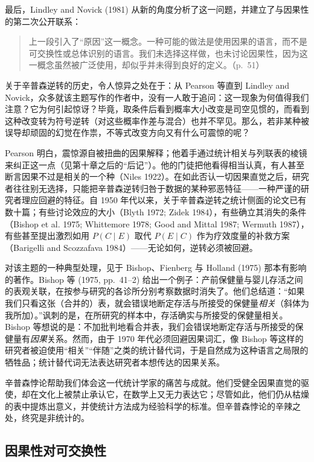 最后，Lindley and Novick (1981) 从新的角度分析了这一问题，并建立了与因果性的第二次公开联系：

\begin{quote}
\kaishu
上一段引入了“原因”这一概念。一种可能的做法是使用因果的语言，而不是可交换性或总体识别的语言。我们未选择这样做，也未讨论因果性，因为这一概念虽然被广泛使用，却似乎并未得到良好的定义。（p.~51）
\end{quote}

关于辛普森逆转的历史，令人惊异之处在于：从 Pearson 等直到 Lindley and Novick，众多就该主题写作的作者中，没有一人敢于追问：这一现象为何值得我们注意？它为何引起惊讶？毕竟，取条件后看到概率大小改变是司空见惯的，而看到这种改变转为符号逆转（对这些概率作差与混合）也并不罕见。那么，若非某种被误导却顽固的幻觉在作祟，不等式改变方向又有什么可震惊的呢？

Pearson 明白，震惊源自被扭曲的因果解释；他着手通过统计相关与列联表的棱镜来纠正这一点（见第十章之后的“后记”）。他的门徒把他看得相当认真，有人甚至断言因果不过是相关的一个种（Niles 1922）。在如此否认一切因果直觉之后，研究者往往别无选择，只能把辛普森逆转归咎于数据的某种邪恶特征——一种严谨的研究者理应回避的特征。自 1950 年代以来，关于辛普森逆转之统计侧面的论文已有数十篇；有些讨论效应的大小（Blyth 1972; Zidek 1984），有些确立其消失的条件（Bishop et al. 1975; Whittemore 1978; Good and Mittal 1987; Wermuth 1987），有些甚至提出激烈如用 $P(C\mid E)$ 取代 $P(E\mid C)$ 作为疗效度量的补救方案（Barigelli and Scozzafava 1984）——无论如何，逆转必须被回避。

对该主题的一种典型处理，见于 Bishop、Fienberg 与 Holland (1975) 那本有影响的著作。Bishop 等 (1975, pp.~41--2) 给出一个例子：产前保健量与婴儿存活之间的表观关联，在按参与研究的各诊所分别考察数据时消失了。他们总结道：“如果我们只看这张（合并的）表，就会错误地断定存活与所接受的保健量\emph{相关}（斜体为我所加）。”讽刺的是，在所研究的样本中，存活确实与所接受的保健量相关。Bishop 等想说的是：不加批判地看合并表，我们会错误地断定存活与所接受的保健量有\emph{因果}关系。然而，由于 1970 年代必须回避因果词汇，像 Bishop 等这样的研究者被迫使用“相关”“伴随”之类的统计替代词，于是自然成为这种语言之局限的牺牲品；统计替代词无法表达研究者本想传达的因果关系。

辛普森悖论帮助我们体会这一代统计学家的痛苦与成就。他们受健全因果直觉的驱使，却在文化上被禁止承认它，在数学上又无力表达它；尽管如此，他们仍从枯燥的表中提炼出意义，并使统计方法成为经验科学的标准。但辛普森悖论的辛辣之处，终究是非统计的。

\subsection{因果性对可交换性}

